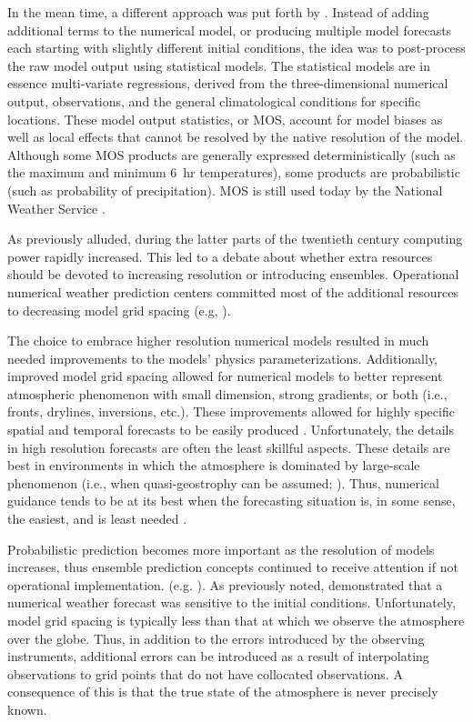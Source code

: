 In the mean time, a different approach was put forth by \cite{Glahn1972}.
Instead of adding additional terms to the numerical model, or producing multiple model forecasts each starting with slightly different initial conditions, the idea was to post-process the raw model output using statistical models.
The statistical models are in essence multi-variate regressions, derived from the three-dimensional numerical output, observations, and the general climatological conditions for specific locations.
These model output statistics, or MOS, account for model biases as well as local effects that cannot be resolved by the native resolution of the model.
Although some MOS products are generally expressed deterministically (such as the maximum and minimum \mbox{6 hr} temperatures), some products are probabilistic (such as probability of precipitation).
MOS is still used today by the National Weather Service \citep{Allen2001a, Allen2001b, Sfanos2001, Carroll2005, Glahn2009}.


As previously alluded, during the latter parts of the twentieth century computing power rapidly increased.
This led to a debate about whether extra resources should be devoted to increasing resolution or introducing ensembles.
Operational numerical weather prediction centers committed most of the additional resources to decreasing model grid spacing (e.g, \citealp{McPherson1991, WMO1992}).


The choice to embrace higher resolution numerical models resulted in much needed improvements to the models' physics parameterizations.
Additionally, improved model grid spacing allowed for numerical models to better represent atmospheric phenomenon with small dimension, strong gradients, or both (i.e., fronts, drylines, inversions, etc.).
These improvements allowed for highly specific spatial and temporal forecasts to be easily produced \citep{Lilly1990}.
Unfortunately, the details in high resolution forecasts are often the least skillful aspects.
These details are best in environments in which the atmosphere is dominated by large-scale phenomenon (i.e., when quasi-geostrophy can be assumed; \citealp{Antolik1989}).
Thus, numerical guidance tends to be at its best when the forecasting situation is, in some sense, the easiest, and is least needed \citep{Brooks1993}.


Probabilistic prediction becomes more important as the resolution of models increases, thus ensemble prediction concepts continued to receive attention if not operational implementation. (e.g. \citealp{Brooks1992a, Brooks1993}).
As previously noted, \cite{Lorenz1963, Lorenz1965, Lorenz1968} demonstrated that a numerical weather forecast was sensitive to the initial conditions.
Unfortunately, model grid spacing is typically less than that at which we observe the atmosphere over the globe.
Thus, in addition to the errors introduced by the observing instruments, additional errors can be introduced as a result of interpolating observations to grid points that do not have collocated observations.
A consequence of this is that the true state of the atmosphere is never precisely known.


